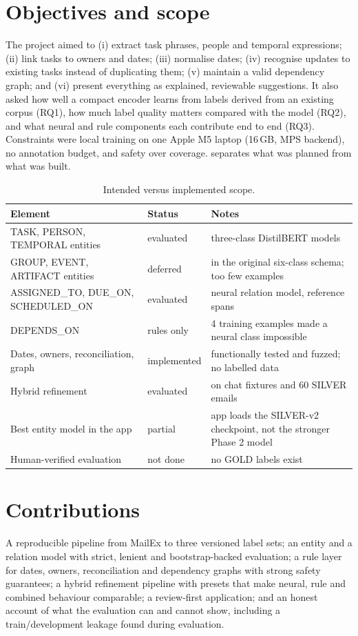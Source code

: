 \section{Objectives and scope}
The project aimed to (i) extract task phrases, people and temporal expressions; (ii) link tasks to owners and dates; (iii) normalise dates; (iv) recognise updates to existing tasks instead of duplicating them; (v) maintain a valid dependency graph; and (vi) present everything as explained, reviewable suggestions. It also asked how well a compact encoder learns from labels derived from an existing corpus (RQ1), how much label quality matters compared with the model (RQ2), and what neural and rule components each contribute end to end (RQ3). Constraints were local training on one Apple M5 laptop (16\,GB, MPS backend), no annotation budget, and safety over coverage.  separates what was planned from what was built.

\begin{table}[htbp]
\centering
\caption{Intended versus implemented scope.}
\label{tab:scope}
\footnotesize
\begin{tabularx}{\linewidth}{@{}p{42mm}p{20mm}L@{}}
\toprule
Element & Status & Notes \\
\midrule
TASK, PERSON, TEMPORAL entities & evaluated & three-class DistilBERT models \\
GROUP, EVENT, ARTIFACT entities & deferred & in the original six-class schema; too few examples \\
ASSIGNED\_TO, DUE\_ON, SCHEDULED\_ON & evaluated & neural relation model, reference spans \\
DEPENDS\_ON & rules only & 4 training examples made a neural class impossible \\
Dates, owners, reconciliation, graph & implemented & functionally tested and fuzzed; no labelled data \\
Hybrid refinement & evaluated & on chat fixtures and 60 SILVER emails \\
Best entity model in the app & partial & app loads the SILVER-v2 checkpoint, not the stronger Phase 2 model \\
Human-verified evaluation & not done & no GOLD labels exist \\
\bottomrule
\end{tabularx}
\end{table}

\section{Contributions}
A reproducible pipeline from MailEx to three versioned label sets; an entity and a relation model with strict, lenient and bootstrap-backed evaluation; a rule layer for dates, owners, reconciliation and dependency graphs with strong safety guarantees; a hybrid refinement pipeline with presets that make neural, rule and combined behaviour comparable; a review-first application; and an honest account of what the evaluation can and cannot show, including a train/development leakage found during evaluation.
